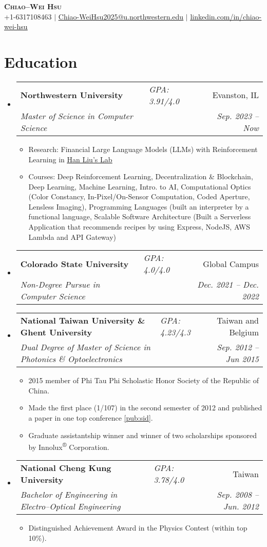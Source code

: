 \documentclass[letterpaper,11pt]{article}
\makeatletter
\newcommand{\resumeItem}[1]{
  \item\small{
    {#1 \vspace{-2pt}}
  }
}
\newcommand{\resumeSubheadingII}[5]{
  \vspace{-2pt}\item
    \begin{tabular*}{0.97\textwidth}[t]{ll@{\extracolsep{\fill}}r}
      \textbf{#1} & \textit{\small#5} & #2 \\
      \textit{\small#3} & \textit{} & \textit{\small #4} \\
    \end{tabular*}\vspace{-7pt}
}
\newcommand{\resumeSubHeadingListStart}{\begin{itemize}[leftmargin=0.1in, label={}]}
\newcommand{\resumeSubHeadingListEnd}{\end{itemize}}
\newcommand{\resumeItemListStart}{\begin{itemize}}
\newcommand{\resumeItemListEnd}{\end{itemize}\vspace{-5pt}}
\makeatother
\begin{document}

\begin{center}
    \textbf{\Huge \scshape Chiao--Wei Hsu} \\ \vspace{1pt}
    \small +1-6317108463 $|$ \href{mailto:Chiao-WeiHsu2025@u.northwestern.edu}{\underline{Chiao-WeiHsu2025@u.northwestern.edu}} $|$ 
    \href{https://linkedin.com/in/chiao-wei-hsu}{\underline{linkedin.com/in/chiao-wei-hsu}}
\end{center}


\section{Education}
  \resumeSubHeadingListStart
    \resumeSubheadingII
      {Northwestern University}{Evanston, IL}
      {Master of Science in Computer Science}{Sep. 2023 -- Now}{GPA: 3.91/4.0}
      \resumeItemListStart
        \resumeItem{Research: Financial Large Language Models (LLMs) with Reinforcement Learning in \href{https://magics.cs.northwestern.edu/index.html}{\underline{Han Liu's Lab}}}
        \resumeItem{Courses: Deep Reinforcement Learning, Decentralization \& Blockchain, Deep Learning, Machine Learning, Intro. to AI, Computational Optics (Color Constancy, In-Pixel/On-Sensor Computation, Coded Aperture, Lensless Imaging), Programming Languages (built an interpreter by a functional language, Scalable Software Architecture (Built a Serverless Application that recommends recipes by using Express, NodeJS, AWS Lambda and API Gateway)}
      \resumeItemListEnd
    \resumeSubheadingII
      {Colorado State University}{Global Campus}
      {Non-Degree Pursue in Computer Science}{Dec. 2021 -- Dec. 2022}{GPA: 4.0/4.0}
      
    \resumeSubheadingII
      {National Taiwan University \& Ghent University}{Taiwan and Belgium}
      {Dual Degree of Master of Science in Photonics \& Optoelectronics}{Sep. 2012 -- Jun 2015}{GPA: 4.23/4.3}
      \resumeItemListStart
        \resumeItem{2015 member of Phi Tau Phi Scholastic Honor Society of the Republic of China.}
        \resumeItem{Made the first place (1/107) in the second semester of 2012 and published a paper in one top conference \ref{pub:sid}.}
        \resumeItem {Graduate assistantship winner and winner of two scholarships sponsored by Innolux\textsuperscript{®} Corporation.}
      \resumeItemListEnd
    \resumeSubheadingII
      {National Cheng Kung University}{Taiwan}{Bachelor of Engineering in Electro--Optical Engineering}{Sep. 2008 -- Jun. 2012}{GPA: 3.78/4.0}
      \resumeItemListStart
        \resumeItem{Distinguished Achievement Award in the Physics Contest (within top 10\%).}
      \resumeItemListEnd
  \resumeSubHeadingListEnd
\end{document}
